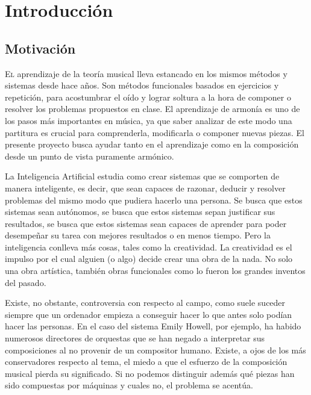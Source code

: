 \chapter{Introducción}
\label{chap:introduccion}


\section{Motivación}
 
  \lettrine{E}l aprendizaje de la teoría musical lleva estancado en los mismos métodos y sistemas desde hace años. Son métodos funcionales basados en ejercicios y repetición, para acostumbrar el oído y lograr soltura a la hora de componer o resolver los problemas propuestos en clase. El aprendizaje de armonía es uno de los pasos más importantes en música, ya que saber analizar de este modo una partitura es crucial para comprenderla, modificarla o componer nuevas piezas. El presente proyecto busca ayudar tanto en el aprendizaje como en la composición desde un punto de vista puramente armónico. 
 
 La Inteligencia Artificial estudia como crear sistemas que se comporten de manera inteligente, es decir, que sean capaces de razonar, deducir y resolver problemas del mismo modo que pudiera hacerlo una persona. Se busca que estos sistemas sean autónomos, se busca que estos sistemas sepan justificar sus resultados, se busca que estos sistemas sean capaces de aprender para poder desempeñar su tarea con mejores resultados o en menos tiempo. Pero la inteligencia conlleva más cosas, tales como la creatividad. La creatividad es el impulso por el cual alguien (o algo) decide crear una obra de la nada. No solo una obra artística, también obras funcionales como lo fueron los grandes inventos del pasado. 
 
 Existe, no obstante, controversia con respecto al campo, como suele suceder siempre que un ordenador empieza a conseguir hacer lo que antes solo podían hacer las personas. En el caso del sistema Emily Howell, por ejemplo, ha habido numerosos directores de orquestas que se han negado a interpretar sus composiciones al no provenir de un compositor humano. Existe, a ojos de los más conservadores respecto al tema, el miedo a que el esfuerzo de la composición musical pierda su significado. Si no podemos distinguir además qué piezas han sido compuestas por máquinas y cuales no, el problema se acentúa. 
 
